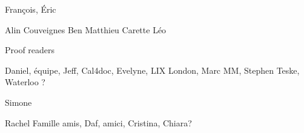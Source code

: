 François, Éric

Alin
Couveignes
Ben
Matthieu
Carette
Léo

Proof readers

Daniel, équipe, Jeff, 
Cal4doc, 
Evelyne, LIX
London, Marc MM, Stephen
Teske, Waterloo ?

Simone

Rachel
Famille
amis, Daf,
amici, Cristina, Chiara?



